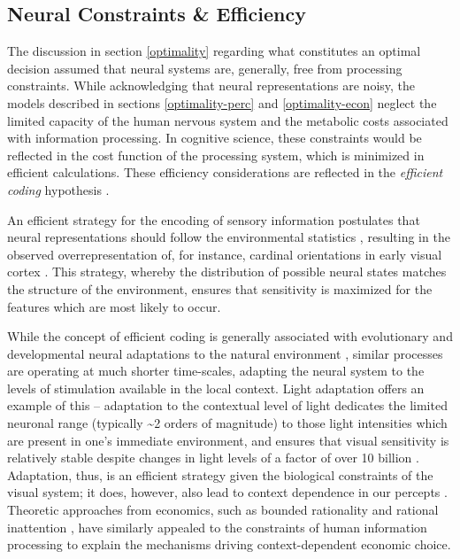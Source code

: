 \documentclass[a4paper, nobind]{templates/ociamthesis}
\begin{document}
\hypertarget{neural-constraints-efficiency}{%
\subsection{Neural Constraints \& Efficiency}\label{neural-constraints-efficiency}}

The discussion in section \ref{optimality} regarding what constitutes an optimal decision assumed that neural systems are, generally, free from processing constraints. While acknowledging that neural representations are noisy, the models described in sections \ref{optimality-perc} and \ref{optimality-econ} neglect the limited capacity of the human nervous system and the metabolic costs associated with information processing. In cognitive science, these constraints would be reflected in the cost function of the processing system, which is minimized in efficient calculations. These efficiency considerations are reflected in the \emph{efficient coding} hypothesis \autocite{barlow1961,simoncelli2003}.

An efficient strategy for the encoding of sensory information postulates that neural representations should follow the environmental statistics \autocite{girshick2011}, resulting in the observed overrepresentation of, for instance, cardinal orientations in early visual cortex \autocite{furmanski2000,li2003}. This strategy, whereby the distribution of possible neural states matches the structure of the environment, ensures that sensitivity is maximized for the features which are most likely to occur.

While the concept of efficient coding is generally associated with evolutionary and developmental neural adaptations to the natural environment \autocite{barlow1961}, similar processes are operating at much shorter time-scales, adapting the neural system to the levels of stimulation available in the local context. Light adaptation offers an example of this -- adaptation to the contextual level of light dedicates the limited neuronal range (typically \textasciitilde2 orders of magnitude) to those light intensities which are present in one's immediate environment, and ensures that visual sensitivity is relatively stable despite changes in light levels of a factor of over 10 billion \autocite[or \textasciitilde10 orders of magnitude,][]{stockman2006}. Adaptation, thus, is an efficient strategy given the biological constraints of the visual system; it does, however, also lead to context dependence in our percepts \autocite{webster2015}. Theoretic approaches from economics, such as bounded rationality \autocite{simon1955} and rational inattention \autocite{sims2003}, have similarly appealed to the constraints of human information processing to explain the mechanisms driving context-dependent economic choice.
\end{document}

